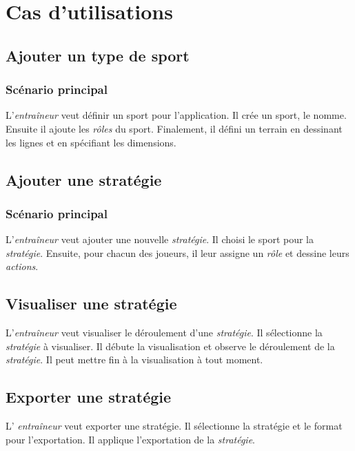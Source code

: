 
\chapter{Cas d'utilisations}
\label{s:cas_utilisation}

\section{Ajouter un type de sport}
\label{sec:ajouter_un_type_de_sport}

\subsection{Sc\'enario principal}
\label{sub:sc'enario_principal}

L'\textit{entra\^ineur} veut définir un sport pour l'application.
Il cr\'ee un sport, le nomme.
Ensuite il ajoute les \textit{r\^oles} du sport.
Finalement, il d\'efini un terrain en dessinant les lignes et en sp\'ecifiant les dimensions.

\section{Ajouter une stratégie}
\label{sec:ajouter_une_strategie}

\subsection{Sc\'enario principal}
\label{sub:sc'enario_principal}

L'\textit{entraîneur} veut ajouter une nouvelle \textit{stratégie}.
Il choisi le sport pour la \textit{strat\'egie}.
Ensuite, pour chacun des joueurs, il leur assigne un \textit{r\^ole} et dessine leurs \textit{actions}.

\section{Visualiser une stratégie}
\label{sec:visualiser_une_strategie}

L'\textit{entra\^ineur} veut visualiser le d\'eroulement d'une \textit{strat\'egie}.
Il s\'electionne la \textit{strat\'egie} \`a visualiser.
Il d\'ebute la visualisation et observe le d\'eroulement de la \textit{strat\'egie}.
Il peut mettre fin \`a la visualisation \`a tout moment.

\section{Exporter une stratégie}
\label{sec:exporter_une_strategie}

L' \textit{entra\^ineur} veut exporter une strat\'egie.
Il s\'electionne la strat\'egie et le format pour l'exportation.
Il applique l'exportation de la \textit{strat\'egie}.
